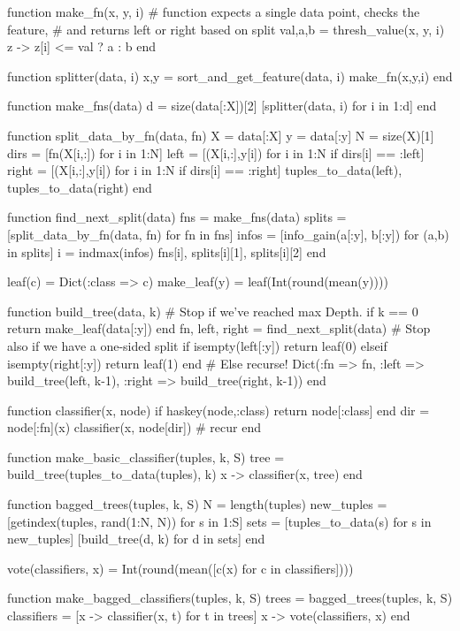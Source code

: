 \documentclass[a4paper,12pt]{article}
\begin{document}
\begin{juliacode}
function make_fn(x, y, i)
    # function expects a single data point, checks the feature,
    # and returns left or right based on split
    val,a,b = thresh_value(x, y, i)
    z -> z[i] <= val ? a : b
end


function splitter(data, i)
    x,y = sort_and_get_feature(data, i)
    make_fn(x,y,i)
end

function make_fns(data)
    d = size(data[:X])[2]
    [splitter(data, i) for i in 1:d]
end


function split_data_by_fn(data, fn)
    X = data[:X]
    y = data[:y]
    N = size(X)[1]
    dirs = [fn(X[i,:]) for i in 1:N]
    left = [(X[i,:],y[i]) for i in 1:N if dirs[i] == :left]
    right = [(X[i,:],y[i]) for i in 1:N if dirs[i] == :right]
    tuples_to_data(left), tuples_to_data(right)
end

function find_next_split(data)
    fns = make_fns(data)
    splits = [split_data_by_fn(data, fn) for fn in fns]
    infos = [info_gain(a[:y], b[:y]) for (a,b) in splits]
    i = indmax(infos)
    fns[i], splits[i][1], splits[i][2]
end

leaf(c) = Dict(:class => c)
make_leaf(y) = leaf(Int(round(mean(y))))

function build_tree(data, k)
    # Stop if we've reached max Depth.
    if k == 0
        return make_leaf(data[:y])
    end
    fn, left, right = find_next_split(data)
    # Stop also if we have a one-sided split
    if isempty(left[:y])
        return leaf(0)
    elseif isempty(right[:y])
        return leaf(1)
    end
    # Else recurse!
    Dict(:fn => fn,
         :left => build_tree(left, k-1),
         :right => build_tree(right, k-1))
end

function classifier(x, node)
    if haskey(node,:class)
        return node[:class]
    end
    dir = node[:fn](x)
    classifier(x, node[dir]) # recur
end

function make_basic_classifier(tuples, k, S)
    tree = build_tree(tuples_to_data(tuples), k)
    x -> classifier(x, tree)
end

function bagged_trees(tuples, k, S)
    N = length(tuples)
    new_tuples = [getindex(tuples, rand(1:N, N)) for s in 1:S]
    sets = [tuples_to_data(s) for s in new_tuples]
    [build_tree(d, k) for d in sets]
end

vote(classifiers, x) = Int(round(mean([c(x) for c in classifiers])))

function make_bagged_classifiers(tuples, k, S)
    trees = bagged_trees(tuples, k, S)
    classifiers = [x -> classifier(x, t) for t in trees]
    x -> vote(classifiers, x)
end


\end{juliacode}
\end{document}

